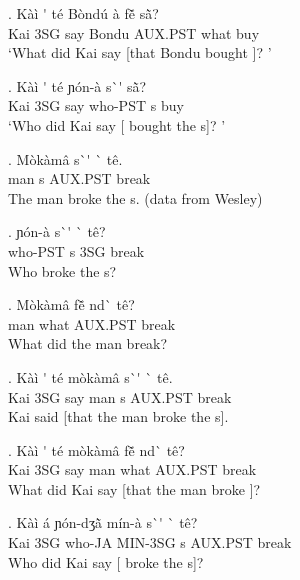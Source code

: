 \documentclass{assets/fieldnotes}
\begin{document}
{\exg. K\`{a}\`{i} \'{} t\'{e} B\`{o}nd\'{u} \`{a} fẽ̌  sã̀? \\ 
Kai 3SG say Bondu AUX.PST what buy \\
`What did Kai say [that Bondu bought ]? '

\exg. K\`{a}\`{i} \'{} t\'{e} ɲ\'{o}n-\`{a} s\`{}\'{} sã̀? \\ 
Kai 3SG say who-PST s buy \\
`Who did Kai say [ bought the s]? '


\exg. M\`{o}k\`{a}m\^{a} s\`{}\'{} \`{} t\^{e}. \\
man s AUX.PST break \\
The man broke the s. (data from Wesley)

\exg. ɲ\'{o}n-\`{a} s\`{}\'{} \`{} t\^{e}? \\
who-PST s 3SG break \\
Who broke the s? 

\exg. M\`{o}k\`{a}m\^{a} fẽ̌  nd\`{} t\^{e}? \\
man what AUX.PST break \\ 
What did the man break? 


\exg. K\`{a}\`{i} \'{} t\'{e} m\`{o}k\`{a}m\^{a} s\`{}\'{} \`{} t\^{e}. \\ 
Kai 3SG say man s AUX.PST break \\
Kai said [that the man broke the s]. 

\exg. K\`{a}\`{i} \'{} t\'{e} m\`{o}k\`{a}m\^{a} fẽ̌  nd\`{}  t\^{e}? \\ 
Kai 3SG say man what AUX.PST break \\
What did Kai say [that the man broke ]? 

\exg. K\`{a}\`{i} \'{a} ɲ\'{o}n-dʒã̀ m\'{i}n-\`{a} s\`{}\'{} \`{}  t\^{e}? \\
Kai 3SG who-JA MIN-3SG s AUX.PST break \\
Who did Kai say [ broke the s]? 


}
\end{document}
